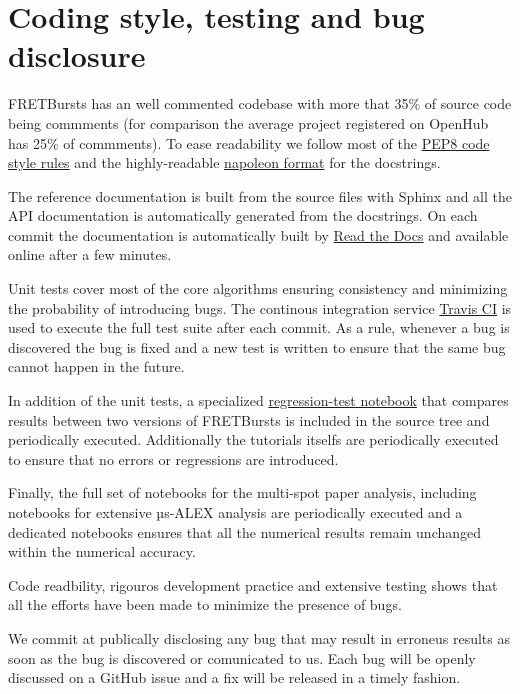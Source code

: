 \section{Coding style, testing and bug disclosure}

FRETBursts has an well commented codebase with more that 35\% of source code
being commments (for comparison the average project registered on OpenHub has 25\%
of commments). To ease readability we follow most of the 
\href{https://www.python.org/dev/peps/pep-0008/}{PEP8 code style rules} and 
the highly-readable \href{http://sphinxcontrib-napoleon.readthedocs.org/}{napoleon format}
for the docstrings.

The reference documentation is built from the source files with Sphinx and
all the API documentation is automatically generated from the docstrings.
On each commit the documentation is automatically built by 
\href{https://readthedocs.org/}{Read the Docs}
and available online after a few minutes.

Unit tests cover most of the core algorithms ensuring consistency and 
minimizing the probability of introducing bugs. The continous integration
service \href{http://travis-ci.org}{Travis CI} is used to execute the full
test suite after each commit.
As a rule, whenever a bug is discovered the bug is fixed and a new test is 
written to ensure that the same bug cannot happen in the future.

In addition of the unit tests, a specialized 
\href{https://github.com/tritemio/FRETBursts/blob/master/notebooks/dev/tests/FRETBursts\%20-\%20Regression\%20tests.ipynb}{regression-test notebook}
that compares results between two versions of FRETBursts is
included in the source tree and periodically executed. Additionally
the tutorials itselfs are periodically executed to ensure that
no errors or regressions are introduced.

Finally, the full set of notebooks for the multi-spot paper analysis,
including notebooks for extensive µs-ALEX analysis are periodically
executed and a dedicated notebooks ensures that all the numerical
results remain unchanged within the numerical accuracy.

Code readbility, rigouros development practice and extensive testing
shows that all the efforts have been made to minimize the presence 
of bugs.

We commit at publically disclosing any bug that may result in erroneus results 
as soon as the bug is discovered or comunicated to us.
Each bug will be openly discussed on a GitHub issue and a fix will be released 
in a timely fashion.
